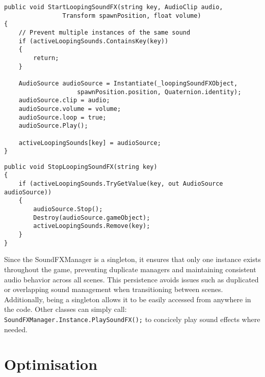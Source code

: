 \documentclass[10pt]{final_report}
\begin{document}
\begin{verbatim}
public void StartLoopingSoundFX(string key, AudioClip audio, 
				Transform spawnPosition, float volume)
{
    // Prevent multiple instances of the same sound
    if (activeLoopingSounds.ContainsKey(key))
    {
        return; 
    }

    AudioSource audioSource = Instantiate(_loopingSoundFXObject, 
					spawnPosition.position, Quaternion.identity);
    audioSource.clip = audio;
    audioSource.volume = volume;
    audioSource.loop = true;
    audioSource.Play();

    activeLoopingSounds[key] = audioSource;
}
\end{verbatim}
\begin{verbatim}
public void StopLoopingSoundFX(string key)
{
    if (activeLoopingSounds.TryGetValue(key, out AudioSource audioSource))
    {
        audioSource.Stop();
        Destroy(audioSource.gameObject);
        activeLoopingSounds.Remove(key);
    }
}
\end{verbatim}

Since the SoundFXManager is a singleton, it ensures that only one instance exists throughout the game, preventing duplicate managers and maintaining consistent audio behavior across all scenes. This persistence avoids issues such as duplicated or overlapping sound management when transitioning between scenes. Additionally, being a singleton allows it to be easily accessed from anywhere in the code. Other classes can simply call:
\newline
\texttt{SoundFXManager.Instance.PlaySoundFX();} to concicely play sound effects where needed.

\section{Optimisation}\label{optimisationdev}
\end{document}
